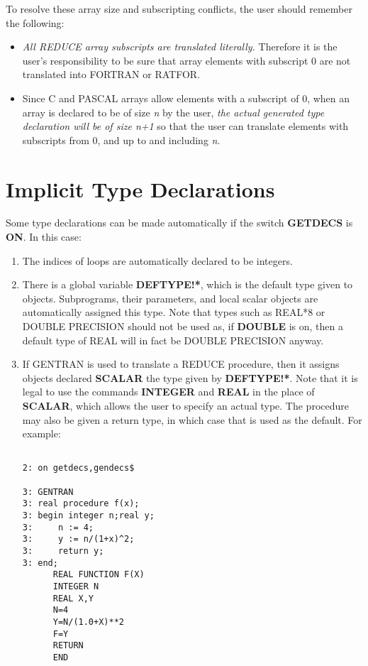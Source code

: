 To resolve these array size and subscripting conflicts, the user should
remember the following:
\begin{itemize}
\item {\it All REDUCE array subscripts are translated literally.}
Therefore it is the user's responsibility to be sure that array elements with
subscript 0 are not translated into FORTRAN or RATFOR.
\item Since C and PASCAL
arrays allow elements with a subscript of 0, when an array is
declared to be of size {\it n} by the user, {\it the actual generated type
declaration will be of size n+1} so that the user can translate
elements with subscripts from 0, and up to and including {\it n}.
\end{itemize}

\section{Implicit Type Declarations}
\label{implicit:type}
Some type  declarations can be made automatically if the switch {\bf GETDECS}
is {\bf ON}.  In this case:
\begin{enumerate}
\item The indices of loops are automatically declared to be integers.
\item There is a global variable {\bf DEFTYPE!*}, which is the default
type given to objects.  Subprograms, their parameters, and local scalar
objects are automatically assigned this type.
Note that types such as REAL*8 or DOUBLE PRECISION should not
be used as, if {\bf DOUBLE} is on, then a default type of REAL
will in fact be DOUBLE PRECISION anyway.
\item  If GENTRAN is used to translate a REDUCE procedure, then it assigns
objects declared {\bf SCALAR} the type given by {\bf DEFTYPE!*}.  Note that
it is legal to use the commands {\bf INTEGER} and {\bf REAL} in the place
of {\bf SCALAR}, which allows the user to specify an actual type.  The
procedure may also be given a return type, in which case that is used as
the default.  For example:
\begin{verbatim}

2: on getdecs,gendecs$

3: GENTRAN
3: real procedure f(x);
3: begin integer n;real y;
3:     n := 4;
3:     y := n/(1+x)^2;
3:     return y;
3: end;
      REAL FUNCTION F(X)
      INTEGER N
      REAL X,Y
      N=4
      Y=N/(1.0+X)**2
      F=Y
      RETURN
      END

\end{verbatim}
\end{enumerate}

